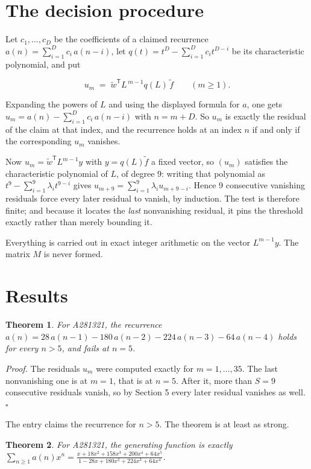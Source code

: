 \documentclass[11pt]{article}
\newtheorem{theorem}{Theorem}
\theoremstyle{definition}
\begin{document}
\section{The decision procedure}

Let $c_1,\dots,c_D$ be the coefficients of a claimed recurrence $a(n) = \sum_{i=1}^{D} c_i\,a(n-i)$, let $q(t) = t^{D} - \sum_{i=1}^{D} c_i t^{D-i}$ be its characteristic polynomial, and put

\[u_m \;=\; \tilde w^{\mathsf T} L^{\,m-1} q(L)\,\tilde f \qquad (m \ge 1).\]

Expanding the powers of $L$ and using the displayed formula for $a$, one gets $u_m = a(n) - \sum_{i=1}^{D} c_i\,a(n-i)$ with $n = m + D$. So $u_m$ is exactly the residual of the claim at that index, and the recurrence holds at an index $n$ if and only if the corresponding $u_m$ vanishes.

Now $u_m = \tilde w^{\mathsf T} L^{m-1} y$ with $y = q(L)\tilde f$ a fixed vector, so $(u_m)$ satisfies the characteristic polynomial of $L$, of degree $9$: writing that polynomial as $t^{9} - \sum_{i=1}^{9} \lambda_i t^{9-i}$ gives $u_{m+9} = \sum_{i=1}^{9} \lambda_i u_{m+9-i}$. Hence $9$ consecutive vanishing residuals force every later residual to vanish, by induction. The test is therefore finite; and because it locates the {\itshape last} nonvanishing residual, it pins the threshold exactly rather than merely bounding it.

Everything is carried out in exact integer arithmetic on the vector $L^{m-1}y$. The matrix $M$ is never formed.

\section{Results}

\begin{theorem} For A281321, the recurrence $a(n) = 28\,a(n-1) - 180\,a(n-2) - 224\,a(n-3) - 64\,a(n-4)$ holds for every $n > 5$, and fails at $n = 5$.\end{theorem}

{\itshape Proof.} The residuals $u_m$ were computed exactly for $m = 1,\dots,35$. The last nonvanishing one is at $m = 1$, that is at $n = 5$. After it, more than $S = 9$ consecutive residuals vanish, so by Section 5 every later residual vanishes as well. $\square$

The entry claims the recurrence for $n > 5$. The theorem is at least as strong.

\begin{theorem} For A281321, the generating function is exactly $\sum_{n\ge 1} a(n)x^n = \frac{x + 18x^{2} + 158x^{3} + 200x^{4} + 64x^{5}}{1 - 28x + 180x^{2} + 224x^{3} + 64x^{4}}$.\end{theorem}
\end{document}
